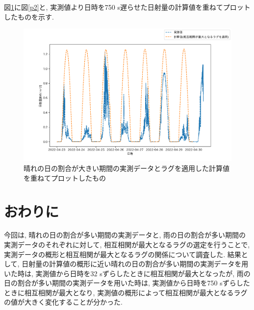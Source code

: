 \documentclass[a4j,12pt,]{jarticle}
\begin{document}
図\ref{p4}に図\ref{p2}と, 実測値より日時を750 \si{\second}遅らせた日射量の計算値を重ねてプロットしたものを示す.

\begin{figure}[H]
  \begin{center}
    \includegraphics[width=160mm]{4.png}
    \caption{晴れの日の割合が大きい期間の実測データとラグを適用した計算値を重ねてプロットしたもの}
    \label{p4}
  \end{center}
\end{figure}

\section{おわりに}
今回は, 晴れの日の割合が多い期間の実測データと, 雨の日の割合が多い期間の実測データのそれぞれに対して, 相互相関が最大となるラグの選定を行うことで, 実測データの概形と相互相関が最大となるラグの関係について調査した.
結果として, 日射量の計算値の概形に近い晴れの日の割合が多い期間の実測データを用いた時は, 実測値から日時を32 \si{\second}ずらしたときに相互相関が最大となったが, 雨の日の割合が多い期間の実測データを用いた時は, 実測値から日時を750 \si{\second}ずらしたときに相互相関が最大となり, 実測値の概形によって相互相関が最大となるラグの値が大きく変化することが分かった.
\end{document}
